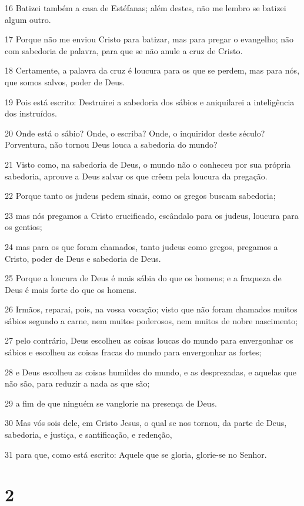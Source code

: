 \par 16 Batizei também a casa de Estéfanas; além destes, não me lembro se batizei algum outro.
\par 17 Porque não me enviou Cristo para batizar, mas para pregar o evangelho; não com sabedoria de palavra, para que se não anule a cruz de Cristo.
\par 18 Certamente, a palavra da cruz é loucura para os que se perdem, mas para nós, que somos salvos, poder de Deus.
\par 19 Pois está escrito: Destruirei a sabedoria dos sábios e aniquilarei a inteligência dos instruídos.
\par 20 Onde está o sábio? Onde, o escriba? Onde, o inquiridor deste século? Porventura, não tornou Deus louca a sabedoria do mundo?
\par 21 Visto como, na sabedoria de Deus, o mundo não o conheceu por sua própria sabedoria, aprouve a Deus salvar os que crêem pela loucura da pregação.
\par 22 Porque tanto os judeus pedem sinais, como os gregos buscam sabedoria;
\par 23 mas nós pregamos a Cristo crucificado, escândalo para os judeus, loucura para os gentios;
\par 24 mas para os que foram chamados, tanto judeus como gregos, pregamos a Cristo, poder de Deus e sabedoria de Deus.
\par 25 Porque a loucura de Deus é mais sábia do que os homens; e a fraqueza de Deus é mais forte do que os homens.
\par 26 Irmãos, reparai, pois, na vossa vocação; visto que não foram chamados muitos sábios segundo a carne, nem muitos poderosos, nem muitos de nobre nascimento;
\par 27 pelo contrário, Deus escolheu as coisas loucas do mundo para envergonhar os sábios e escolheu as coisas fracas do mundo para envergonhar as fortes;
\par 28 e Deus escolheu as coisas humildes do mundo, e as desprezadas, e aquelas que não são, para reduzir a nada as que são;
\par 29 a fim de que ninguém se vanglorie na presença de Deus.
\par 30 Mas vós sois dele, em Cristo Jesus, o qual se nos tornou, da parte de Deus, sabedoria, e justiça, e santificação, e redenção,
\par 31 para que, como está escrito: Aquele que se gloria, glorie-se no Senhor.

\chapter{2}

